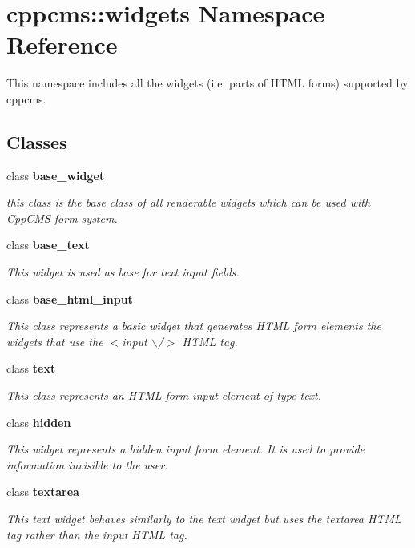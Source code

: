 \section{cppcms\-:\-:widgets \-Namespace \-Reference}
\label{namespacecppcms_1_1widgets}


\-This namespace includes all the widgets (i.\-e. parts of \-H\-T\-M\-L forms) supported by cppcms.  


\subsection*{\-Classes}
\begin{DoxyCompactItemize}
\item 
class {\bf base\-\_\-widget}
\begin{DoxyCompactList}\small\item\em this class is the base class of all renderable widgets which can be used with \-Cpp\-C\-M\-S form system. \end{DoxyCompactList}\item 
class {\bf base\-\_\-text}
\begin{DoxyCompactList}\small\item\em \-This widget is used as base for text input fields. \end{DoxyCompactList}\item 
class {\bf base\-\_\-html\-\_\-input}
\begin{DoxyCompactList}\small\item\em \-This class represents a basic widget that generates \-H\-T\-M\-L form elements the widgets that use the $<$input $\backslash$/$>$ \-H\-T\-M\-L tag. \end{DoxyCompactList}\item 
class {\bf text}
\begin{DoxyCompactList}\small\item\em \-This class represents an \-H\-T\-M\-L form input element of type text. \end{DoxyCompactList}\item 
class {\bf hidden}
\begin{DoxyCompactList}\small\item\em \-This widget represents a hidden input form element. \-It is used to provide information invisible to the user. \end{DoxyCompactList}\item 
class {\bf textarea}
\begin{DoxyCompactList}\small\item\em \-This text widget behaves similarly to the text widget but uses the {\ttfamily textarea} \-H\-T\-M\-L tag rather than the {\ttfamily input} \-H\-T\-M\-L tag. \end{DoxyCompactList}\item 

\end{DoxyCompactItemize}
